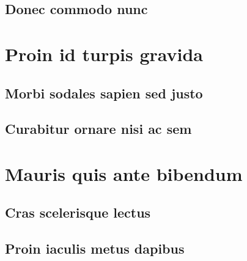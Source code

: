 \documentclass[10pt,a4paper]{article}
\theoremstyle{remark}
\begin{document}
\subsection{Donec commodo nunc}

\section{Proin id turpis gravida}
\subsection{Morbi sodales sapien sed justo}
\subsection{Curabitur ornare nisi ac sem}
\section{Mauris quis ante bibendum}
\subsection{Cras scelerisque lectus}
\subsection{Proin iaculis metus dapibus}
\end{document}
